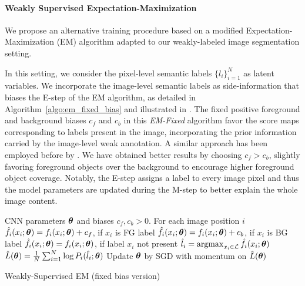 \paragraph{Weakly Supervised Expectation-Maximization}

We propose an alternative training procedure based on a modified
Expectation-Maximization (EM) algorithm adapted to our weakly-labeled
image segmentation setting.

In this setting, we consider the pixel-level semantic labels
$\{l_i\}_{i=1}^N$ as latent variables. We incorporate the image-level
semantic labels as side-information that biases the E-step of the EM
algorithm, as detailed in Algorithm~\ref{algo:em_fixed_bias} and
illustrated in . The fixed positive
foreground and background biases $c_f$ and $c_b$ in this
\textsl{EM-Fixed} algorithm favor the score maps corresponding to
labels present in the image, incorporating the prior information
carried by the image-level weak annotation. A similar approach has
been employed before by \citet{Lu2013sports}. We have obtained better
results by choosing $c_f > c_b$, slightly favoring foreground objects
over the background to encourage higher foreground object
coverage. Notably, the E-step assigns a label to every image pixel and
thus the model parameters are updated during the M-step to better
explain the whole image content.

\begin{algorithm}[!htbp]
  \centering
  \begin{algorithmic}[1]
    \algrenewcommand{}
    \Require CNN parameters $\boldsymbol{\theta}$ and biases $c_f, c_b > 0$.
    \algrenewcommand{}
    \Require For each image position $i$
    \State $\hat{f}_i (x_i; \boldsymbol{\theta}) = f_i(x_i; \boldsymbol{\theta}) + c_f$, if $x_i$ is FG label 
    \State $\hat{f}_i (x_i; \boldsymbol{\theta}) = f_i(x_i; \boldsymbol{\theta}) + c_b$, if $x_i$ is BG label 
    \State $\hat{f}_i (x_i; \boldsymbol{\theta}) = f_i(x_i; \boldsymbol{\theta})$, if label $x_i$ not present
    \State $\hat{l}_i = \mathop{\mathrm{argmax}}_{x_i \in \mathcal{L}} \hat{f}_i (x_i; \boldsymbol{\theta})$ 
    \algrenewcommand{}
    \Require
    \State $\hat{L}(\boldsymbol{\theta}) = \frac{1}{N} \sum_{i = 1}^N \log P_i(\hat{l}_i; \boldsymbol{\theta})$ 
    \State Update $\boldsymbol{\theta}$ by SGD with momentum on $\hat{L}(\boldsymbol{\theta})$
    \end{algorithmic}
  \caption{Weakly-Supervised EM (fixed bias version)}
  \label{algo:em_fixed_bias}
\end{algorithm}


